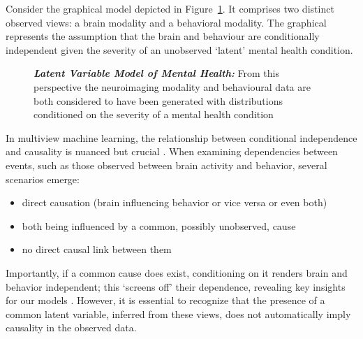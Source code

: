 Consider the graphical model depicted in Figure~\ref{fig:mentalhealthselfsupervised}.
It comprises two distinct observed \gls{views}: a brain modality and a behavioral modality.
The graphical represents the assumption that the brain and behaviour are conditionally independent given the severity of an unobserved `latent' mental health condition.

\begin{figure}
    \centering
    \caption[Latent Variable Model of Mental Health]{\textit{\textbf{Latent Variable Model of Mental Health:}} From this perspective the neuroimaging modality and behavioural data are both considered to have been generated with distributions conditioned on the severity of a mental health condition}\label{fig:mentalhealthselfsupervised}
\end{figure}

In multiview machine learning, the relationship between conditional independence and causality is nuanced but crucial \citep{pearl2009causality}.
When examining dependencies between events, such as those observed between brain activity and behavior, several scenarios emerge:

\begin{itemize}
    \item direct causation (brain influencing behavior or vice versa or even both)
    \item both being influenced by a common, possibly unobserved, cause
    \item no direct causal link between them
\end{itemize}

Importantly, if a common cause does exist, conditioning on it renders brain and behavior independent; this `screens off' their dependence, revealing key insights for our models \citep{reichenbach1956direction}.
However, it is essential to recognize that the presence of a common latent variable, inferred from these \gls{views}, does not automatically imply causality in the observed data.

